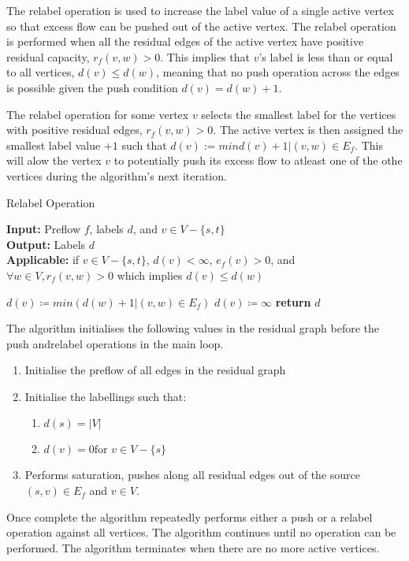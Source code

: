 \begin{definition}
	The relabel operation is used to increase the label value of a single active vertex so that excess flow can be pushed out of the active vertex. The relabel operation is performed when all the residual edges of the active vertex have positive residual capacity, $r_f(v,w)>0$. This implies that $v$'s label is less than or equal to all vertices, $d(v) \leq d(w)$, meaning that no push operation across the edges is possible given the push condition $d(v) = d(w)+1$.
\end{definition}
The relabel operation for some vertex $v$ selects the smallest label for the vertices with positive residual edges, $r_f(v,w)>0$. The active vertex is then assigned the smallest label value $+1$ such that $d(v) := min{d(v)+1 | (v,w) \in E_f}$. This will alow the vertex $v$ to potentially push its excess flow to atleast one of the othe vertices during the algorithm's next iteration.

\begin{algorithm}
	\caption{Relabel Operation}\label{alg:relabel}
	\textbf{Input:} Preflow $f$, labels $d$, and $v \in V-\{s,t\}$\\
	\textbf{Output:} Labels $d$\\
	\textbf{Applicable:} if $v \in V-\{s,t\}$, $d(v) < \infty$, $e_f(v)>0$, and $\forall w \in V, r_f(v,w)>0$ which implies $d(v) \leq d(w)$
	\begin{algorithmic}[1]
		\State $d(v) \coloneqq min(d(w)+1 | (v,w) \in E_f)$
		\Else 
		\State $d(v) \coloneqq \infty$
		\EndIf
		\State \textbf{return} $d$
		\EndProcedure
	\end{algorithmic}
\end{algorithm}

The algorithm initialises the following values in the residual graph before the push andrelabel operations in the main loop.
\begin{enumerate}
	\item Initialise the preflow of all edges in the  residual graph
	
	\item Initialise the labellings such that:
	\begin{enumerate}
		\item $d(s) = |V|$
		\item $d(v) = 0 \text{for } v \in V-\{s\}$
	\end{enumerate}
	
	\item Performs saturation, pushes along all residual edges out of the source $(s,v) \in E_f$ and $v \in V$.
\end{enumerate}
Once complete the algorithm repeatedly performs either a push or a relabel operation against all vertices. The algorithm continues until no operation can be performed. The algorithm terminates when there are no more active vertices.

